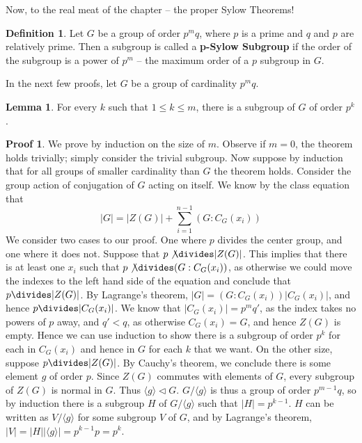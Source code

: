 \documentclass[12pt]{amsbook}
\theoremstyle{definition}
\newtheorem{lemma}[theorem]{Lemma}
\newtheorem{definition}{Definition}
\newtheorem*{prf}{Proof}
\newcommand{\gen}[1]{\langle #1 \rangle} %
\begin{document}
Now, to the real meat of the chapter -- the proper Sylow Theorems!

\begin{definition}
    Let $G$ be a group of order $p^mq$, where $p$ is a prime and $q$ and $p$ are relatively prime. Then a subgroup is called a {\bf p-Sylow Subgroup}  if the order of the subgroup is a power of $p^m$ -- the maximum order of a $p$ subgroup in $G$.
\end{definition}

In the next few proofs, let $G$ be a group of cardinality $p^mq$.

\begin{lemma}
    For every $k$ such that $1 \leq k \leq m$, there is a subgroup of $G$ of order $p^k$.
\end{lemma}
\begin{prf}
    We prove by induction on the size of $m$. Observe if $m = 0$, the theorem holds trivially; simply consider the trivial subgroup. Now suppose by induction that for all groups of smaller cardinality than $G$ the theorem holds. Consider the group action of conjugation of $G$ acting on itself. We know by the class equation that
    \[ |G| = |Z(G)| + \sum_{i = 1}^{n-1} (G:C_G(x_i)) \]
    We consider two cases to our proof. One where $p$ divides the center group, and one where it does not. Suppose that $p \not\divides |Z(G)|$. This implies that there is at least one $x_i$ such that $p \not \divides (G:C_G(x_i))$, as otherwise we could move the indexes to the left hand side of the equation and conclude that $p \divides|Z(G)|$. By Lagrange's theorem, $|G| = (G:C_G(x_i))|C_G(x_i)|$, and hence $p \divides |C_G(x_i)|$. We know that $|C_G(x_i)| = p^{m}q'$, as the index takes no powers of $p$ away, and $q' < q$, as otherwise $C_G(x_i) = G$, and hence $Z(G)$ is empty. Hence we can use induction to show there is a subgroup of order $p^k$ for each in $C_G(x_i)$ and hence in $G$ for each $k$ that we want. On the other size, suppose $p \divides |Z(G)|$. By Cauchy's theorem, we conclude there is some element $g$ of order $p$. Since $Z(G)$ commutes with elements of $G$, every subgroup of $Z(G)$ is normal in $G$. Thus $\gen{g} \lhd G$. $G/\gen{g}$ is thus a group of order $p^{m-1}q$, so by induction there is a subgroup $H$ of $G/\gen{g}$ such that $|H| = p^{k-1}$. $H$ can be written as $V/\gen{g}$ for some subgroup $V$ of $G$, and by Lagrange's theorem, $|V| = |H||\gen{g}| = p^{k-1}p = p^k$.
\end{prf}
\end{document}
